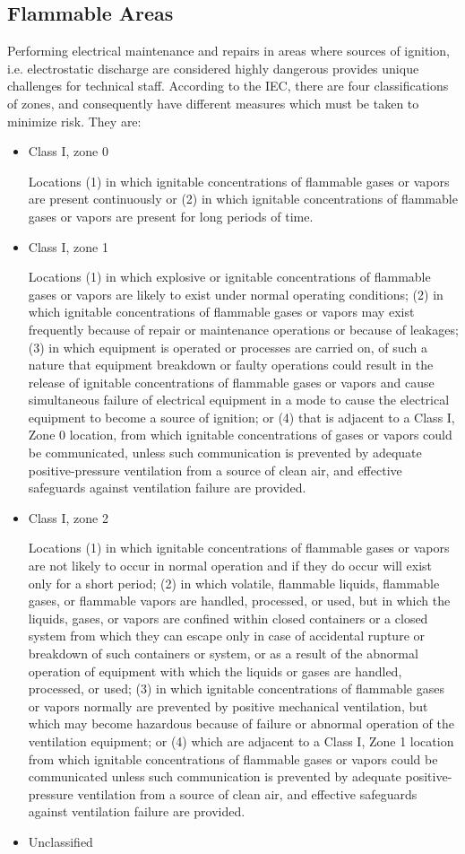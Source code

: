 \documentclass[11pt,a4paper]{article}
\begin{document}
\subsection{Flammable Areas}
Performing electrical maintenance and repairs in areas where sources of ignition, i.e. electrostatic discharge are considered highly dangerous provides unique challenges for technical staff. According to the IEC, there are four classifications of zones, and consequently have different measures which must be taken to minimize risk. They are:
\begin{itemize}
    \item Class I, zone 0

Locations (1) in which ignitable concentrations of flammable gases or vapors are present continuously or (2) in which ignitable concentrations of flammable gases or vapors are present for long periods of time.
\item Class I, zone 1

Locations (1) in which explosive or ignitable concentrations of flammable gases or vapors are likely to exist under normal operating conditions; (2) in which ignitable concentrations of flammable gases or vapors may exist frequently because of repair or maintenance operations or because of leakages; (3) in which equipment is operated or processes are carried on, of such a nature that equipment breakdown or faulty operations could result in the release of ignitable concentrations of flammable gases or vapors and cause simultaneous failure of electrical equipment in a mode to cause the electrical equipment to become a source of ignition; or (4) that is adjacent to a Class I, Zone 0 location, from which ignitable concentrations of gases or vapors could be communicated, unless such communication is prevented by adequate positive-pressure ventilation from a source of clean air, and effective safeguards against ventilation failure are provided.
\item Class I, zone 2

Locations (1) in which ignitable concentrations of flammable gases or vapors are not likely to occur in normal operation and if they do occur will exist only for a short period; (2) in which volatile, flammable liquids, flammable gases, or flammable vapors are handled, processed, or used, but in which the liquids, gases, or vapors are confined within closed containers or a closed system from which they can escape only in case of accidental rupture or breakdown of such containers or system, or as a result of the abnormal operation of equipment with which the liquids or gases are handled, processed, or used; (3) in which ignitable concentrations of flammable gases or vapors normally are prevented by positive mechanical ventilation, but which may become hazardous because of failure or abnormal operation of the ventilation equipment; or (4) which are adjacent to a Class I, Zone 1 location from which ignitable concentrations of flammable gases or vapors could be communicated unless such communication is prevented by adequate positive-pressure ventilation from a source of clean air, and effective safeguards against ventilation failure are provided.
\item Unclassified


\end{itemize}
\end{document}
